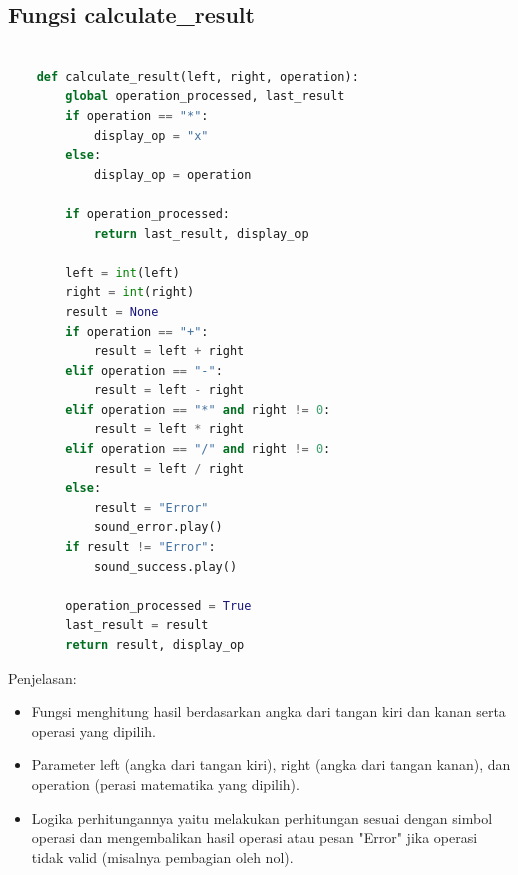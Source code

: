 \documentclass[11pt,a4paper]{article}
\begin{document}
    \subsection{Fungsi calculate\_result}
    \begin{lstlisting}[language=Python, caption=Fungsi Perhitungan]
    
    def calculate_result(left, right, operation):
        global operation_processed, last_result
        if operation == "*":
            display_op = "x"
        else:
            display_op = operation
        
        if operation_processed:
            return last_result, display_op
        
        left = int(left)
        right = int(right)
        result = None
        if operation == "+":
            result = left + right
        elif operation == "-":
            result = left - right
        elif operation == "*" and right != 0:
            result = left * right
        elif operation == "/" and right != 0:
            result = left / right
        else:
            result = "Error"
            sound_error.play()
        if result != "Error":
            sound_success.play()

        operation_processed = True
        last_result = result
        return result, display_op
    \end{lstlisting}
    Penjelasan:
    \begin{itemize}
        \item Fungsi menghitung hasil berdasarkan angka dari tangan kiri dan kanan serta operasi yang dipilih.
        \item Parameter left (angka dari tangan kiri), right (angka dari tangan kanan), dan operation (perasi matematika yang dipilih).
        \item Logika perhitungannya yaitu melakukan perhitungan sesuai dengan simbol operasi dan mengembalikan hasil operasi atau pesan "Error" jika operasi tidak valid (misalnya pembagian oleh nol).
    \end{itemize}
\end{document}
